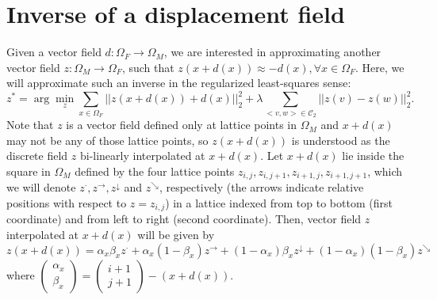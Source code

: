 \documentclass[11pt]{article}
\begin{document}
\section{Inverse of a displacement field}
Given a vector field $d:\Omega_{F} \rightarrow \Omega_{M}$, we are interested in approximating another vector field $z:\Omega_{M} \rightarrow \Omega_{F}$, such that $z(x+d(x)) \approx -d(x), \forall x\in \Omega_{F}$. Here, we will approximate such an inverse in the regularized least-squares sense:
\begin{equation}\label{eq_inv_ls}
	z^{*} = \arg\min_{z}\sum_{x\in \Omega_{F}}||z(x+d(x)) + d(x)||_{2}^{2} + \lambda\sum_{<v,w>\in \mathcal{C}_{2}}||z(v)-z(w)||_{2}^{2}.
\end{equation}
Note that $z$ is a vector field defined only at lattice points in $\Omega_{M}$ and $x+d(x)$ may not be any of those lattice points, so $z(x+d(x))$ is understood as the discrete field $z$ bi-linearly interpolated at $x+d(x)$. Let $x+d(x)$ lie inside the square in $\Omega_{M}$ defined by the four lattice points $z_{i,j}, z_{i,j+1}, z_{i+1,j}, z_{i+1,j+1}$, which we will denote $z^{\cdot}, z^{\rightarrow}, z^{\downarrow}$ and $z^{\searrow}$, respectively (the arrows indicate relative positions with respect to $z=z_{i,j}$) in a lattice indexed from top to bottom (first coordinate) and from left to right (second coordinate). Then, vector field $z$ interpolated at $x+d(x)$ will be given by
\begin{equation}
	z(x+d(x))=\alpha_{x}\beta_{x}z^{\cdot} + \alpha_{x}(1-\beta_{x})z^{\rightarrow} + (1-\alpha_{x})\beta_{x}z^{\downarrow} + (1-\alpha_{x})(1-\beta_{x})z^{\searrow}
\end{equation}
where $\left(\begin{array}{c}\alpha_{x} \\ \beta_{x}\end{array}\right) = \left(\begin{array}{c}i+1 \\ j+1\end{array}\right) - (x+d(x))$.\\
\end{document}
